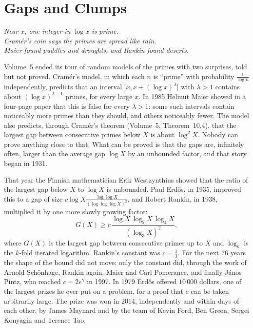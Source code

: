 \chapter{Gaps and Clumps}\label{ch:gaps}
\begin{center}\itshape
Near $x$, one integer in $\log x$ is prime.\\
Cramér's coin says the primes are spread like rain.\\
Maier found puddles and droughts, and Rankin found deserts.
\end{center}

Volume~5 ended its tour of random models of the primes with two surprises, told but not proved. Cramér's model, in which each $n$ is ``prime'' with probability $\frac1{\log n}$ independently, predicts that an interval $]x,x+(\log x)^\lambda]$ with $\lambda>1$ contains about $(\log x)^{\lambda-1}$ primes, for every large $x$. In 1985 Helmut Maier showed in a four-page paper that this is false for every $\lambda>1$: some such intervals contain noticeably more primes than they should, and others noticeably fewer. The model also predicts, through Cramér's theorem (Volume~5, Theorem~10.4), that the largest gap between consecutive primes below $X$ is about $\log^2X$. Nobody can prove anything close to that. What can be proved is that the gaps are, infinitely often, larger than the average gap $\log X$ by an unbounded factor, and that story began in 1931.

That year the Finnish mathematician Erik Westzynthius showed that the ratio of the largest gap below $X$ to $\log X$ is unbounded. Paul Erd\H{o}s, in 1935, improved this to a gap of size $c\log X\frac{\log\log X}{(\log\log\log X)^2}$, and Robert Rankin, in 1938, multiplied it by one more slowly growing factor:
\[
G(X)\ge c\,\frac{\log X\,\log_2X\,\log_4X}{(\log_3X)^2},
\]
where $G(X)$ is the largest gap between consecutive primes up to $X$ and $\log_k$ is the $k$-fold iterated logarithm. Rankin's constant was $c=\frac13$. For the next 76 years the shape of the bound did not move; only the constant did, through the work of Arnold Schönhage, Rankin again, Maier and Carl Pomerance, and finally János Pintz, who reached $c=2e^\gamma$ in 1997. In 1979 Erd\H{o}s offered $10\,000$ dollars, one of the largest prizes he ever put on a problem, for a proof that $c$ can be taken arbitrarily large. The prize was won in 2014, independently and within days of each other, by James Maynard and by the team of Kevin Ford, Ben Green, Sergei Konyagin and Terence Tao.

